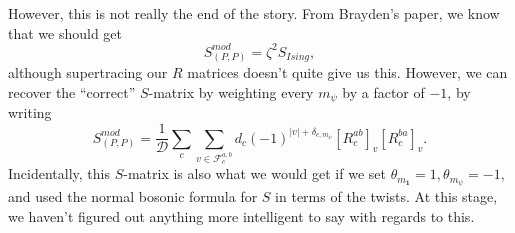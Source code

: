 \documentclass[12pt,a4paper]{article}
\newcommand{\unit}{\mathbf{1}}
\newcommand{\mcd}{\mathcal{D}}
\newcommand{\zt}{\mathbb{Z}_2}
\newcommand\be            {\begin{equation}}
\newcommand\ee            {\end{equation}}
\newcommand{\End}{\text{End}}
\newcommand{\wt}{\widetilde}
\newcommand{\fld}{\mathcal{F}}
\newcommand{\dave}[1]{{\color{ao(english)}\footnotesize{(DA) #1}}}
\newcommand{\ethan}[1]{{\color{amethyst}\footnotesize{(EL) #1}}}
\begin{document}
{{However, this is not really the end of the story. From Brayden's paper, we know that we should get 
\be S^{mod}_{(P,P)} = \zeta^2S_{Ising},\ee
although supertracing our $R$ matrices doesn't quite give us this. However, we can recover the ``correct'' $S$-matrix by weighting every $m_\psi$ by a factor of $-1$, by writing 
\be S^{mod}_{(P,P)} = \frac{1}{\mcd} \sum_c \sum_{v\in \fld^{a,b}_c} d_c (-1)^{|v| + \delta_{c,m_\psi}} [R^{ab}_c]_v[R^{ba}_c]_v.\ee
Incidentally, this $S$-matrix is also what we would get if we set $\theta_{m_\unit} = 1,\theta_{m_\psi} = -1$, and used the normal bosonic formula for $S$ in terms of the twists. At this stage, we haven't figured out anything more intelligent to say with regards to this. 



}}
\end{document}
